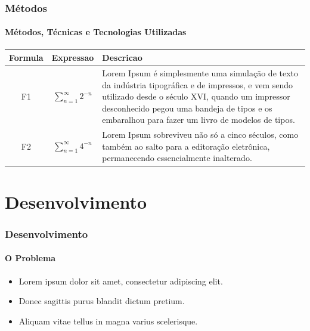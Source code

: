 \documentclass{beamer}
\begin{document}
    
    \begin{frame}
      \frametitle{Métodos}
      \framesubtitle{Métodos, Técnicas e Tecnologias Utilizadas}
      
        \begin{center}
            \begin{tabular}{ |c|c|p{7cm}| } 
            \hline
            Formula & Expressao & Descricao \\
            \hline
            \multirow{5}{*}{F1} & \multirow{5}{*}{$\sum_{n=1}^{\infty} 2^{-n}$} & \multirow{5}{7cm}{\footnotesize{Lorem Ipsum é simplesmente uma simulação de texto da indústria tipográfica e de impressos, e vem sendo utilizado desde o século XVI, quando um impressor desconhecido pegou uma bandeja de tipos e os embaralhou para fazer um livro de modelos de tipos.}~\cite{loremipsum}} \\ %
            & & \\ %
            & & \\ %
            & & \\ %
            & & \\ %
            \hline
            \multirow{3}{*}{F2} & \multirow{3}{*}{$\sum_{n=1}^{\infty} 4^{-n}$} & \multirow{3}{7cm}{\footnotesize{Lorem Ipsum sobreviveu não só a cinco séculos, como também ao salto para a editoração eletrônica, permanecendo essencialmente inalterado.}~\cite{loremipsum}} \\ %
            & & \\ %
            & & \\ %
            \hline
            \end{tabular}
        \end{center}
      
    \end{frame}
    
    \section{Desenvolvimento}
    
    \begin{frame}
      \frametitle{Desenvolvimento}
      \framesubtitle{O Problema}
    
      \begin{itemize}    
            \item Lorem ipsum dolor sit amet, consectetur adipiscing elit.
            \item Donec sagittis purus blandit dictum pretium.
            \item Aliquam vitae tellus in magna varius scelerisque.
            \end{itemize}
    \end{frame}
    
\end{document}
